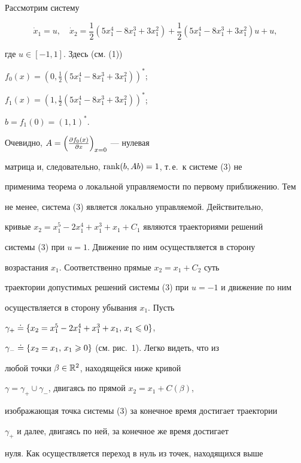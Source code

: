 \begin{exam}


Рассмотрим систему


\begin{equation}


\Dot x_1=u,\quad


\Dot x_2=


\frac{1}{2}(5x_1^4-8x_1^3+3x_1^2)+\frac{1}{2}(5x_1^4-8x_1^3+3x_1^2)u+u,


\end{equation}


где $u\in[-1,1]$. Здесь (см. (1))


$f_0(x)=(0,\frac{1}{2}(5x_1^4-8x_1^3+3x_1^2))^{*}$;


$f_1(x)=(1,\frac{1}{2}(5x_1^4-8x_1^3+3x_1^2))^{*}$;


$b=f_1(0)=(1,1)^{*}$.


Очевидно, $A=\left(\frac{\partial f_0(x)}{\partial x}\right)_{x=0}$ --- нулевая


матрица и, следовательно, $\operatorname{rank} (b,Ab)=1$, т.\,е.~к системе (3) не


применима теорема о локальной управляемости по первому приближению. Тем


не менее, система (3) является локально управляемой. Действительно,


кривые $x_2=x_1^5-2x_1^4+x_1^3+x_1+C_1$ являются траекториями решений


системы (3) при $u=1$. Движение по ним осуществляется в сторону


возрастания $x_1$. Соответственно прямые $x_2=x_1+C_2$ суть


траектории допустимых решений системы (3) при $u=-1$ и движение по ним


осуществляется в сторону убывания $x_1$. Пусть


$\gamma_{+}\doteq\{x_2=x_1^5-2x_1^4+x_1^3+x_1,\,x_1\leqslant 0\}$,


$\gamma_{-}\doteq\{x_2=x_1,\,x_1\geqslant 0\}$ (см. рис.~1). Легко видеть, что из


любой точки $\beta\in\Bbb R^2$, находящейся ниже кривой


$\gamma=\gamma_{+}\cup\gamma_{-}$, двигаясь по прямой $x_2=x_1+C(\beta)$,


изображающая точка системы (3) за конечное время достигает траектории


$\gamma_{+}$ и далее, двигаясь по ней, за конечное же время достигает


нуля. Как осуществляется переход в нуль из точек, находящихся выше



\end{exam}
